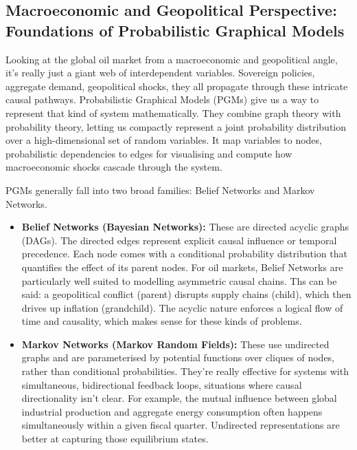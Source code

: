 \documentclass[11pt,a4paper]{article}
\begin{document}
\subsection{Macroeconomic and Geopolitical Perspective: Foundations of Probabilistic Graphical Models}

Looking at the global oil market from a macroeconomic and geopolitical angle, 
it's really just a giant web of interdependent variables. Sovereign policies, 
aggregate demand, geopolitical shocks, they all propagate through these intricate 
causal pathways. Probabilistic Graphical Models (PGMs) give us a way to 
represent that kind of system mathematically. They combine graph theory with 
probability theory, letting us compactly represent a joint probability 
distribution over a high-dimensional set of random variables. It map 
variables to nodes, probabilistic dependencies to edges for visualising and 
compute how macroeconomic shocks cascade through the system.

PGMs generally fall into two broad families: Belief Networks and Markov Networks.

\begin{itemize}
    \item \textbf{Belief Networks (Bayesian Networks):} These are directed acyclic graphs (DAGs). 
    The directed edges represent explicit causal influence or temporal precedence. 
    Each node comes with a conditional probability distribution that quantifies 
    the effect of its parent nodes. For oil markets, Belief Networks are particularly 
    well suited to modelling asymmetric causal chains. 
    Ths can be said: a geopolitical conflict (parent) disrupts supply chains (child), 
    which then drives up inflation (grandchild). The acyclic nature enforces a 
    logical flow of time and causality, which makes sense for these kinds of problems.
    \item \textbf{Markov Networks (Markov Random Fields):} These use undirected 
    graphs and are parameterised by potential functions over cliques of nodes, 
    rather than conditional probabilities. They're really effective for systems 
    with simultaneous, bidirectional feedback loops, situations where causal 
    directionality isn't clear. For example, the mutual influence between global 
    industrial production and aggregate energy consumption often happens 
    simultaneously within a given fiscal quarter. Undirected representations are 
    better at capturing those equilibrium states.
\end{itemize}
\end{document}
